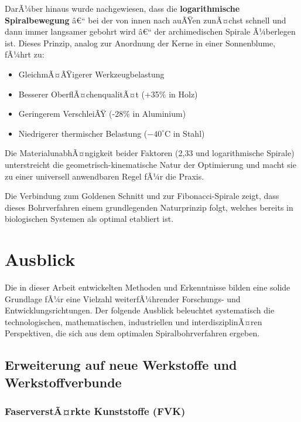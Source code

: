 ﻿\documentclass[12pt,a4paper]{article}
\begin{document}
DarÃ¼ber hinaus wurde nachgewiesen, dass die \textbf{logarithmische Spiralbewegung} â€“ bei der von innen nach auÃŸen zunÃ¤chst schnell und dann immer langsamer gebohrt wird â€“ der archimedischen Spirale Ã¼berlegen ist. Dieses Prinzip, analog zur Anordnung der Kerne in einer Sonnenblume, fÃ¼hrt zu:

\begin{itemize}
	\item GleichmÃ¤ÃŸigerer Werkzeugbelastung
	\item Besserer OberflÃ¤chenqualitÃ¤t (+35\% in Holz)
	\item Geringerem VerschleiÃŸ (-28\% in Aluminium)
	\item Niedrigerer thermischer Belastung ($-40^\circ\text{C}$ in Stahl)
\end{itemize}

Die MaterialunabhÃ¤ngigkeit beider Faktoren (2,33 und logarithmische Spirale) unterstreicht die geometrisch-kinematische Natur der Optimierung und macht sie zu einer universell anwendbaren Regel fÃ¼r die Praxis.

Die Verbindung zum Goldenen Schnitt und zur Fibonacci-Spirale zeigt, dass dieses Bohrverfahren einem grundlegenden Naturprinzip folgt, welches bereits in biologischen Systemen als optimal etabliert ist.


\section{Ausblick}

Die in dieser Arbeit entwickelten Methoden und Erkenntnisse bilden eine solide Grundlage fÃ¼r eine Vielzahl weiterfÃ¼hrender Forschungs- und Entwicklungsrichtungen. Der folgende Ausblick beleuchtet systematisch die technologischen, mathematischen, industriellen und interdisziplinÃ¤ren Perspektiven, die sich aus dem optimalen Spiralbohrverfahren ergeben.

\subsection{Erweiterung auf neue Werkstoffe und Werkstoffverbunde}

\subsubsection{FaserverstÃ¤rkte Kunststoffe (FVK)}
\end{document}
